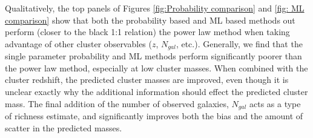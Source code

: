 \documentclass[fleqn,usenatbib]{mnras}
\begin{document}
Qualitatively, the top panels of Figures \ref{fig:Probability comparison} and \ref{fig: ML comparison} show that both the probability based and ML based methods out perform (closer to the black 1:1 relation) the power law method when taking advantage of other cluster observables ($z$, $N_{gal}$, etc.). Generally, we find that the single parameter probability and ML methods perform significantly poorer than the power law method, especially at low cluster masses. When combined with the cluster redshift, the predicted cluster masses are improved, even though it is unclear exactly why the additional information should effect the predicted cluster mass. The final addition of the number of observed galaxies, $N_{gal}$ acts as a type of richness estimate, and significantly improves both the bias and the amount of scatter in the predicted masses.


\end{document}
